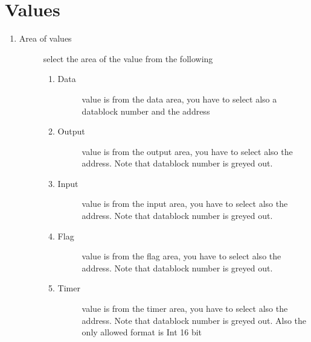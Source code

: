 \documentclass[a4paper,10pt,english]{sphinxmanual}
\begin{document}
\section{Values}
\label{\detokenize{values:values}}
\begin{enumerate}
%
\item {} \begin{description}
\item[{Area of values}] \leavevmode
select the area of the value from the following
\begin{enumerate}
%
\item {} \begin{description}
\item[{Data}] \leavevmode
value is from the data area, you have to select also a datablock number and the address

\end{description}

\item {} \begin{description}
\item[{Output}] \leavevmode
value is from the output area, you have to select also  the address.
Note that datablock number is greyed out.

\end{description}

\item {} \begin{description}
\item[{Input}] \leavevmode
value is from the input area, you have to select also  the address.
Note that datablock number is greyed out.

\end{description}

\item {} \begin{description}
\item[{Flag}] \leavevmode
value is from the flag area, you have to select also  the address.
Note that datablock number is greyed out.

\end{description}

\item {} \begin{description}
\item[{Timer}] \leavevmode
value is from the timer area, you have to select also  the address.
Note that datablock number is greyed out.
Also the only allowed format is Int 16 bit


\end{description}
\end{enumerate}
\end{description}
\end{enumerate}
\end{document}
